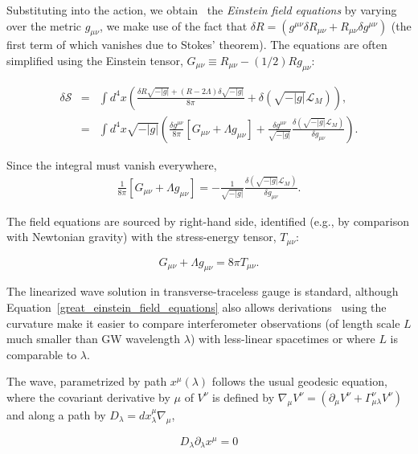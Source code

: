 Substituting into the action, we obtain~\cite{Carroll1997} the \textit{Einstein field equations} by varying over the metric $g_{\mu\nu}$, we make use of the fact that $\delta R = (g^{\mu\nu} \delta R_{\mu\nu} + R_{\mu\nu} \delta g^{\mu\nu})$ (the first term of which vanishes due to Stokes' theorem).
The equations are often simplified using the Einstein tensor, $G_{\mu\nu} \equiv R_{\mu\nu} - (1/2)R g_{\mu\nu}$:

\begin{eqnarray}
\delta \mathcal{S} &=& \int d^4 x \left( \frac{\delta R \sqrt{-|g|} + (R-2\Lambda)\delta \sqrt{-|g|}}{8\pi}+ \delta (\sqrt{-|g|}\mathcal{L}_M)\right), \\
 &=& \int d^4 x \sqrt{-|g|}\left( \frac{\delta g^{\mu\nu}}{8\pi} \left[ G_{\mu\nu} + \Lambda g_{\mu\nu} \right]
 + \frac{\delta g^{\mu \nu}}{\sqrt{-|g|}} \frac{\delta (\sqrt{-|g|}\mathcal{L}_M)}{\delta g_{\mu\nu}} \right).
\end{eqnarray}

\noindent Since the integral must vanish everywhere,
\begin{eqnarray}
\frac{1}{8\pi} \left[G_{\mu\nu} + \Lambda g_{\mu\nu} \right] = -\frac{1}{\sqrt{-|g|}}\frac{\delta (\sqrt{-|g|}\mathcal{L}_M)}{\delta g_{\mu\nu}}.
\end{eqnarray}

\noindent The field equations are sourced by right-hand side, identified (e.g., by comparison with Newtonian gravity) with the stress-energy tensor, $T_{\mu\nu}$:

\begin{equation}
G_{\mu\nu} + \Lambda g_{\mu\nu} = 8 \pi T_{\mu\nu}.
\label{great_einstein_field_equations}
\end{equation}

\noindent The linearized wave solution in transverse-traceless gauge is standard, although Equation~\ref{great_einstein_field_equations} also allows derivations~\cite{KoopFinn2014} using the curvature make it easier to compare interferometer observations (of length scale $L$ much smaller than GW wavelength $\lambda$) with less-linear spacetimes or where $L$ is comparable to $\lambda$.

The wave, parametrized by path $x^\mu (\lambda)$ follows the usual geodesic equation, where the covariant derivative by $\mu$ of $V^\nu$ is defined by $\nabla_\mu V^\nu = (\partial_\mu V^\nu + \Gamma^\nu_{\mu\lambda} V^\nu)$ and along a path by $D_\lambda = dx^\mu_\lambda \nabla_\mu$,

\begin{equation}
D_\lambda \partial_\lambda x^\mu = 0
\end{equation}


